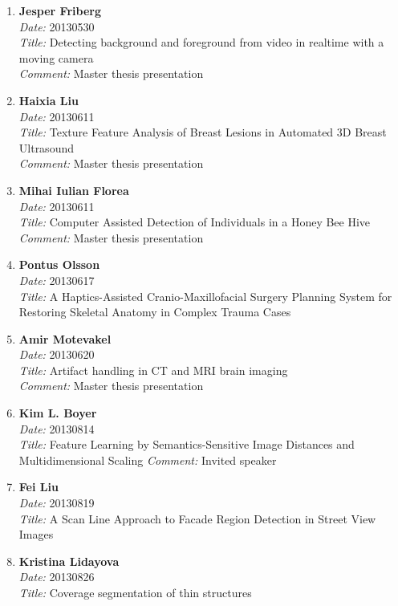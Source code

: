 \begin{enumerate}
\item
{\bf Jesper Friberg}~\\
{\em Date:} 20130530 ~\\
{\em Title:} Detecting background and foreground from video in realtime with a moving camera~\\
{\em Comment:} Master thesis presentation

\item
{\bf Haixia Liu}~\\
{\em Date:} 20130611 ~\\
{\em Title:} Texture Feature Analysis of Breast Lesions in Automated 3D Breast Ultrasound~\\
{\em Comment:} Master thesis presentation

\item
{\bf Mihai Iulian Florea}~\\
{\em Date:} 20130611 ~\\
{\em Title:} Computer Assisted Detection of Individuals in a Honey Bee Hive~\\
{\em Comment:} Master thesis presentation

\item
{\bf Pontus Olsson}~\\
{\em Date:} 20130617 ~\\
{\em Title:} A Haptics-Assisted Cranio-Maxillofacial Surgery Planning System for Restoring Skeletal Anatomy in Complex Trauma Cases

\item
{\bf Amir Motevakel}~\\
{\em Date:} 20130620 ~\\
{\em Title:} Artifact handling in CT and MRI brain imaging~\\
{\em Comment:} Master thesis presentation

\item 
{\bf Kim L. Boyer}~\\
{\em Date:} 20130814~\\
{\em Title:} Feature Learning by Semantics-Sensitive Image Distances and Multidimensional Scaling
{\em Comment:} Invited speaker

\item
{\bf Fei Liu}~\\
{\em Date:} 20130819 ~\\
{\em Title:} A Scan Line Approach to Facade Region Detection in Street View Images

\item
{\bf Kristina Lidayova}~\\
{\em Date:} 20130826 ~\\
{\em Title:} Coverage segmentation of thin structures


\end{enumerate}
